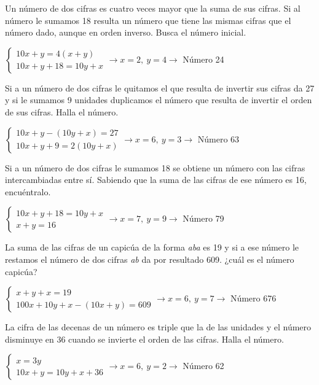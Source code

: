 \documentclass[spanish, 12pt]{exam}
\begin{document}
\begin{questions}
\question Un número de dos cifras es cuatro veces mayor que la suma de sus cifras. Si al número le sumamos 18 resulta un número que tiene las mismas cifras que el número dado, aunque en orden inverso. Busca el número inicial.
\begin{solution} $\left\{\begin{matrix}10x+y=4(x+y) \\ 10x+y+18=10y+x\end{matrix}\right. \to  x = 2, \  y = 4 \to$ Número 24 \end{solution}

\question Si a un número de dos cifras le quitamos el que resulta de invertir sus cifras da 27 y si le sumamos 9 unidades duplicamos el número que resulta de invertir el orden de sus cifras. Halla el número.
\begin{solution} $\left\{\begin{matrix}10x+y-(10y+x)=27 \\ 10x+y+9=2(10y+x)\end{matrix}\right. \to  x = 6, \  y = 3 \to$ Número 63 \end{solution}

\question Si a un número de dos cifras le sumamos 18 se obtiene un número con las cifras intercambiadas entre sí. Sabiendo que la suma de las cifras de ese número es 16, encuéntralo.
\begin{solution} $\left\{\begin{matrix}10x+y+18=10y+x \\ x+y=16\end{matrix}\right. \to  x = 7, \  y = 9 \to$ Número 79 \end{solution}

\question La suma de las cifras de un capicúa de la forma \emph{aba} es 19 y si a ese número le restamos el número de dos cifras \emph{ab} da por resultado 609. ¿cuál es el número capicúa?
\begin{solution} $\left\{\begin{matrix}x+y+x=19 \\ 100x+10y+x-(10x+y)=609\end{matrix}\right. \to  x = 6, \  y = 7 \to$ Número 676 \end{solution}

\question La cifra de las decenas de un número es triple que la de las unidades y el número disminuye en 36 cuando se invierte el orden de las cifras. Halla el número.
\begin{solution} $\left\{\begin{matrix}x=3y \\ 10x+y=10y+x+36\end{matrix}\right. \to  x = 6, \  y = 2 \to $ Número 62 \end{solution}


\end{questions}
\end{document}

